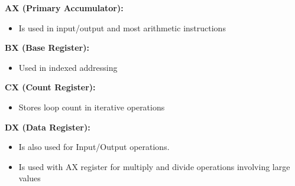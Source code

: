 \documentclass[12pt]{article}
\begin{document}
\begin{enumerate}[1.]
\begin{itemize}
\begin{itemize}
\begin{itemize}
                \bigskip

                \textbf{AX (Primary Accumulator):}

                \begin{itemize}
                    \item Is used in input/output and most arithmetic instructions
                \end{itemize}

                \bigskip

                \textbf{BX (Base Register):}

                \begin{itemize}
                    \item Used in indexed addressing
                \end{itemize}

                \bigskip

                \textbf{CX (Count Register):}

                \begin{itemize}
                    \item Stores loop count in iterative operations
                \end{itemize}

                \bigskip

                \textbf{DX (Data Register):}
                \begin{itemize}
                    \item Is also used for Input/Output operations.
                    \item Is used with AX register for multiply and divide operations
                    involving large values
                \end{itemize}


                \bigskip


\end{itemize}
\end{itemize}
\end{itemize}
\end{enumerate}
\end{document}
